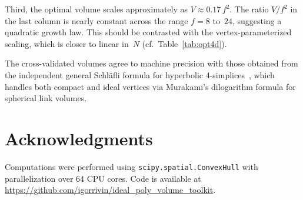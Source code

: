 \documentclass[11pt]{article}
\begin{document}
Third, the optimal volume scales approximately as
$V \approx 0.17\,f^2$.  The ratio $V/f^2$ in the last column is
nearly constant across the range $f = 8$ to~$24$, suggesting a
quadratic growth law.  This should be contrasted with the
vertex-parameterized scaling, which is closer to linear in~$N$
(cf.\ Table~\ref{tab:opt4d}).

The cross-validated volumes agree to machine precision with
those obtained from the independent general Schl\"afli formula
for hyperbolic 4-simplices~\cite{Murakami2011}, which handles
both compact and ideal vertices via Murakami's dilogarithm formula
for spherical link volumes.

\section*{Acknowledgments}

Computations were performed using \texttt{scipy.spatial.ConvexHull}
with parallelization over 64 CPU cores.  Code is available at
\url{https://github.com/igorrivin/ideal_poly_volume_toolkit}.
\end{document}
